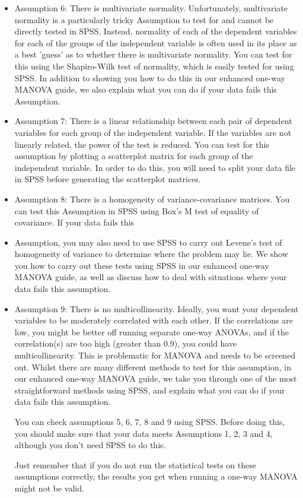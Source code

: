 \documentclass[12pt]{article} %
\begin{document}
\begin{itemize}
\item Assumption 6: There is multivariate normality. Unfortunately, multivariate normality is a particularly tricky Assumption to test for and cannot be directly tested in SPSS. Instead, normality of each of the dependent variables for each of the groups of the independent variable is often used in its place as a best 'guess' as to whether there is multivariate normality. You can test for this using the Shapiro-Wilk test of normality, which is easily tested for using SPSS. In addition to showing you how to do this in our enhanced one-way MANOVA guide, we also explain what you can do if your data fails this Assumption.
\item Assumption 7: There is a linear relationship between each pair of dependent variables for each group of the independent variable. If the variables are not linearly related, the power of the test is reduced. You can test for this  assumption by plotting a scatterplot matrix for each group of the independent variable. In order to do this, you will need to split your data file in SPSS before generating the scatterplot matrices.
\item Assumption 8: There is a homogeneity of variance-covariance matrices. You can test this Assumption in SPSS using Box's M test of equality of covariance. If your data fails this \item Assumption, you may also need to use SPSS to carry out Levene's test of homogeneity of variance to determine where the problem may lie. We show you how to carry out these tests using SPSS in our enhanced one-way MANOVA guide, as well as discuss how to deal with situations where your data fails this assumption.
\item Assumption 9: There is no multicollinearity. Ideally, you want your dependent variables to be moderately correlated with each other. If the correlations are low, you might be better off running separate one-way ANOVAs, and if the correlation(s) are too high (greater than 0.9), you could have multicollinearity. This is problematic for MANOVA and needs to be screened out. Whilst there are many different methods to test for this assumption, in our enhanced one-way MANOVA guide, we take you through one of the most straightforward methods using SPSS, and explain what you can do if your data fails this assumption.

You can check assumptions 5, 6, 7, 8 and 9 using SPSS. 
Before doing this, you should make sure that your data meets Assumptions 1, 2, 3 and 4, although you don't need SPSS to do this. 

Just remember that if you do not run the statistical tests on these assumptions correctly, the results you get when running a one-way MANOVA might not be valid. 
\end{itemize}
\end{document}

